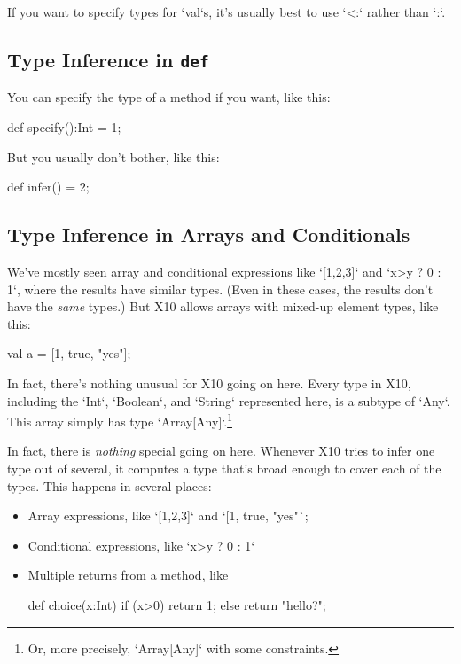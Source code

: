 If you want to specify types for \xcd`val`s, it's usually best to use \xcd`<:`
rather than \xcd`:`.

\subsection{Type Inference in {\tt def}}

You can specify the type of a method if you want, like this: 
\begin{xtennum}[]
def specify():Int = 1;
\end{xtennum}
But you usually don't bother, like this:
\begin{xtennum}[]
def infer() = 2; 
\end{xtennum}


\subsection{Type Inference in Arrays and Conditionals}

We've mostly seen array and conditional expressions like \xcd`[1,2,3]`
and \xcd`x>y ? 0 : 1`, where the results have similar types.  (Even in these
cases, the results don't have the {\em same} types.)  But X10 allows 
arrays with mixed-up element types, like this: 
\begin{xtennum}[]
val a = [1, true, "yes"];
\end{xtennum}
In fact, there's nothing unusual for X10 going on here.  Every type in X10,
including the  \xcd`Int`, \xcd`Boolean`, and \xcd`String` represented here, is
a subtype of \xcd`Any`.  This array simply has type
\xcd`Array[Any]`.\footnote{Or, more precisely, \xcd`Array[Any]` with some
constraints.}  

In fact, there is {\em nothing} special going on here.  Whenever X10 tries to
infer one type out of several, it computes a type that's broad enough to cover
each of the types.  This happens in several places: 
\begin{itemize}
\item Array expressions, like \xcd`[1,2,3]` and \xcd`[1, true, "yes"`;
\item Conditional expressions, like \xcd`x>y ? 0 : 1`
\item Multiple returns from a method, like 
\begin{xten}
def choice(x:Int) { 
  if (x>0) return 1; else return "hello?"; 
}
\end{xten}
\end{itemize}


